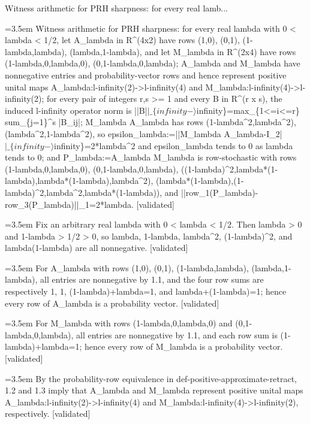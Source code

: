 \documentclass{article}
\newcommand{\step}[1]{\par\noindent\hangindent=3.5em\hangafter=1%
  \makebox[3.5em][l]{\textbf{#1.}}}
\newcommand{\steptag}[1]{\hfill{\small\textsf{[#1]}}}
\begin{document}
\begin{proofbox}{Witness arithmetic for PRH sharpness: for every real lamb...}
\step{1} Witness arithmetic for PRH sharpness: for every real lambda with 0 < lambda < 1/2, let A\_lambda in R\textasciicircum{}(4x2) have rows (1,0), (0,1), (1-lambda,lambda), (lambda,1-lambda), and let M\_lambda in R\textasciicircum{}(2x4) have rows (1-lambda,0,lambda,0), (0,1-lambda,0,lambda); A\_lambda and M\_lambda have nonnegative entries and probability-vector rows and hence represent positive unital maps A\_lambda:l-infinity(2)->l-infinity(4) and M\_lambda:l-infinity(4)->l-infinity(2); for every pair of integers r,s >= 1 and every B in R\textasciicircum{}(r x s), the induced l-infinity operator norm is ||B|$|\_\{infinity-\rangle$infinity\}=max\_\{1<=i<=r\} sum\_\{j=1\}\textasciicircum{}s |B\_ij|; M\_lambda A\_lambda has rows (1-lambda\textasciicircum{}2,lambda\textasciicircum{}2), (lambda\textasciicircum{}2,1-lambda\textasciicircum{}2), so epsilon\_lambda:=||M\_lambda A\_lambda-I\_2|$|\_\{infinity-\rangle$infinity\}=2*lambda\textasciicircum{}2 and epsilon\_lambda tends to 0 as lambda tends to 0; and P\_lambda:=A\_lambda M\_lambda is row-stochastic with rows (1-lambda,0,lambda,0), (0,1-lambda,0,lambda), ((1-lambda)\textasciicircum{}2,lambda*(1-lambda),lambda*(1-lambda),lambda\textasciicircum{}2), (lambda*(1-lambda),(1-lambda)\textasciicircum{}2,lambda\textasciicircum{}2,lambda*(1-lambda)), and ||row\_1(P\_lambda)-row\_3(P\_lambda)||\_1=2*lambda. \steptag{validated} \\[6pt]
\step{1.1} Fix an arbitrary real lambda with 0 < lambda < 1/2. Then lambda > 0 and 1-lambda > 1/2 > 0, so lambda, 1-lambda, lambda\textasciicircum{}2, (1-lambda)\textasciicircum{}2, and lambda(1-lambda) are all nonnegative. \steptag{validated} \\[4pt]
\step{1.2} For A\_lambda with rows (1,0), (0,1), (1-lambda,lambda), (lambda,1-lambda), all entries are nonnegative by 1.1, and the four row sums are respectively 1, 1, (1-lambda)+lambda=1, and lambda+(1-lambda)=1; hence every row of A\_lambda is a probability vector. \steptag{validated} \\[4pt]
\step{1.3} For M\_lambda with rows (1-lambda,0,lambda,0) and (0,1-lambda,0,lambda), all entries are nonnegative by 1.1, and each row sum is (1-lambda)+lambda=1; hence every row of M\_lambda is a probability vector. \steptag{validated} \\[4pt]
\step{1.4} By the probability-row equivalence in def-positive-approximate-retract, 1.2 and 1.3 imply that A\_lambda and M\_lambda represent positive unital maps A\_lambda:l-infinity(2)->l-infinity(4) and M\_lambda:l-infinity(4)->l-infinity(2), respectively. \steptag{validated} \\[4pt]

\end{proofbox}
\end{document}
